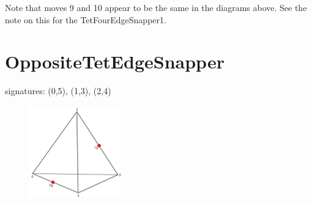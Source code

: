 \documentclass{article}
\begin{document}
\setcounter{subfigure}{0}

Note that moves 9 and 10 appear to be the same in the diagrams above.
See the note on this for the TetFourEdgeSnapper1.


\clearpage


\section{OppositeTetEdgeSnapper}

signatures: (0,5), (1,3), (2,4)

\begin{figure}[h!]
\includegraphics[width=4cm]{OppositeTetEdgeSnapper}
\end{figure}
\end{document}

